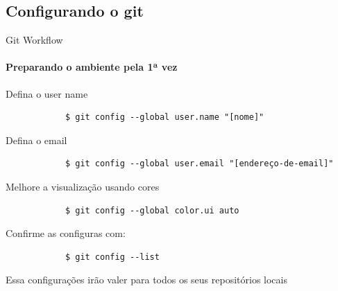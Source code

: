 \documentclass[xcolor=dvipsnames,t]{beamer}
\begin{document}
\subsection{Configurando o git}
\begin{frame}[fragile]{Git Workflow}
	\framesubtitle{Preparando o ambiente pela 1ª vez}

	\begin{block}{Defina o user name}		
		\begin{verbatim}
			$ git config --global user.name "[nome]"
		\end{verbatim}
	\end{block}
	
	\begin{block}{Defina o email}
		\begin{verbatim}
			$ git config --global user.email "[endereço-de-email]"
		\end{verbatim}
	\end{block}

	\begin{exampleblock}{Melhore a visualização usando cores}
		\begin{verbatim}
			$ git config --global color.ui auto
		\end{verbatim}
	\end{exampleblock}

	\begin{exampleblock}{Confirme as configuras com:}
		\begin{verbatim}
			$ git config --list
		\end{verbatim}
\end{exampleblock}

{\footnotesize *	Essa configurações irão valer para todos os seus repositórios locais}
\end{frame}
\end{document}
